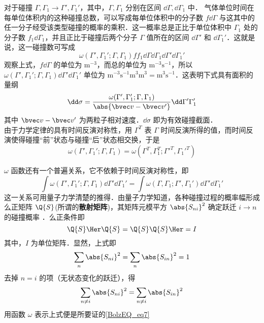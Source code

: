  对于碰撞 $\Gamma,\Gamma_1\rightarrow\Gamma',\Gamma_1'$，其中，$\Gamma,\Gamma_1$ 分别在区间 $\dd\Gamma,\dd\Gamma_1$ 中． 气体单位时间在每单位体积内的这种碰撞总数，可以写成每单位体积中的分子数 $f\dd\Gamma$ 与这其中的任一分子经受该类型碰撞的概率的乘积．这一概率总是正比于单位体积中 $\Gamma_1$ 处的分子数 $f_1\dd \Gamma_1$，并且正比于碰撞后两个分子 $\Gamma$ 值所在的区间 $\dd\Gamma'$ 和 $\dd \Gamma_1'$．这就是说，这一碰撞数可写成
 \begin{equation}\label{BolzEQ_eq5}
\omega(\Gamma',\Gamma_1';\Gamma,\Gamma_1)ff_1\dd\Gamma\dd\Gamma_1\dd\Gamma'\dd\Gamma_1'
 \end{equation}
 观察上式，$f\dd \Gamma$ 的单位为 $\mathrm{m^{-3}}$，而总的单位为 $\mathrm{m^{-3}s^{-1}}$，所以 $\omega(\Gamma',\Gamma_1';\Gamma,\Gamma_1)\dd\Gamma'\dd\Gamma_1'$ 单位为 $\mathrm{m^{-3}s^{-1}m^{3}m^{3}=m^3s^{-1}}$．这表明下式具有面积的量纲
 \begin{equation}\label{BolzEQ_eq2}
 \dd \sigma=\frac{\omega(\Gamma',\Gamma_1';\Gamma,\Gamma_1)}{\abs{\bvec v-\bvec v'}}\dd\Gamma'\Gamma_1'
 \end{equation}
 其中 $\bvec v-\bvec v'$ 为两粒子相对速度．$\dd\sigma$ 即为有效碰撞截面．\\

由于力学定律的具有时间反演对称性，用 $\Gamma^T$ 表 $\Gamma$ 时间反演所得的值，而时间反演使得碰撞“前”状态与碰撞“后”状态相交换，于是
 \begin{equation}
 \omega(\Gamma',\Gamma_1';\Gamma,\Gamma_1)=\omega(\Gamma^T,\Gamma_1^T;\Gamma'^T,\Gamma_1'^T)
 \end{equation}
 
$\omega$ 函数还有一个普遍关系，它不依赖于时间反演对称性，即
\begin{equation}\label{BolzEQ_eq7}
\int\omega(\Gamma',\Gamma_1';\Gamma,\Gamma_1)\dd\Gamma'\dd\Gamma_1'=\int\omega(\Gamma,\Gamma_1;\Gamma',\Gamma_1')\dd\Gamma'\dd\Gamma_1'
\end{equation}
这一关系可用量子力学清楚的推得．由量子力学知道，各种碰撞过程的概率幅形成么正矩阵 $\Q{S}$(所谓的\textbf{散射矩阵})，其矩阵元模平方 $\abs{S_{ni}}^2$ 确定跃迁 $i\rightarrow n$ 的碰撞概率 ．么正条件即
\begin{equation}
\Q{S}\Her\Q{S}=\Q{S}\Q{S}\Her=I
\end{equation}
其中，$I$ 为单位矩阵．显然，上式即
\begin{equation}
\sum_n \abs{S_{ni}}^2=\sum_n \abs{S_{in}}^2=1
\end{equation}
去掉 $n=i$ 的项（无状态变化的跃迁），得
\begin{equation}
\sum_{n\neq i} \abs{S_{ni}}^2=\sum_{n\neq i} \abs{S_{in}}^2
\end{equation}
用函数 $\omega$ 表示上式便是所要证的\autoref{BolzEQ_eq7} 
